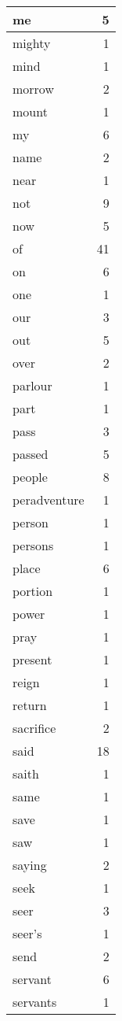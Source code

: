 \begin{center}
\begin{longtable}{l|r}
me & 5 \\ \hline
mighty & 1 \\ \hline
mind & 1 \\ \hline
morrow & 2 \\ \hline
mount & 1 \\ \hline
my & 6 \\ \hline
name & 2 \\ \hline
near & 1 \\ \hline
not & 9 \\ \hline
now & 5 \\ \hline
of & 41 \\ \hline
on & 6 \\ \hline
one & 1 \\ \hline
our & 3 \\ \hline
out & 5 \\ \hline
over & 2 \\ \hline
parlour & 1 \\ \hline
part & 1 \\ \hline
pass & 3 \\ \hline
passed & 5 \\ \hline
people & 8 \\ \hline
peradventure & 1 \\ \hline
person & 1 \\ \hline
persons & 1 \\ \hline
place & 6 \\ \hline
portion & 1 \\ \hline
power & 1 \\ \hline
pray & 1 \\ \hline
present & 1 \\ \hline
reign & 1 \\ \hline
return & 1 \\ \hline
sacrifice & 2 \\ \hline
said & 18 \\ \hline
saith & 1 \\ \hline
same & 1 \\ \hline
save & 1 \\ \hline
saw & 1 \\ \hline
saying & 2 \\ \hline
seek & 1 \\ \hline
seer & 3 \\ \hline
seer's & 1 \\ \hline
send & 2 \\ \hline
servant & 6 \\ \hline
servants & 1 \\ \hline

\end{longtable}
\end{center}
